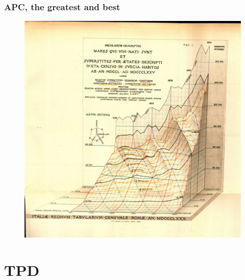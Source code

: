 \documentclass[20pt]{beamer}
\begin{document}
\begin{frame}
\frametitle{APC, the greatest and best}
\begin{figure}[b]
    \centering
    \includegraphics[scale=.5]{Figures/LabPres/Perozzo1000px_cropped_adj.png}
\end{figure} 
\end{frame}

\section{TPD}

\end{document}
